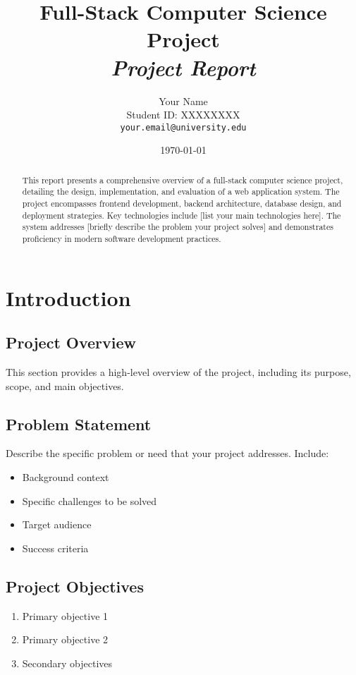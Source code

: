 \documentclass[12pt,a4paper]{article}
\title{
    \LARGE \textbf{Full-Stack Computer Science Project} \\
    \Large \textit{Project Report}
}
\author{
    Your Name \\
    Student ID: XXXXXXXX \\
    \texttt{your.email@university.edu}
}
\date{\today}
\begin{document}
\maketitle
\thispagestyle{empty}

\newpage

\begin{abstract}
This report presents a comprehensive overview of a full-stack computer science project, detailing the design, implementation, and evaluation of a web application system. The project encompasses frontend development, backend architecture, database design, and deployment strategies. Key technologies include [list your main technologies here]. The system addresses [briefly describe the problem your project solves] and demonstrates proficiency in modern software development practices.
\end{abstract}

\newpage

\tableofcontents
\newpage

\listoffigures
\newpage

\listoftables
\newpage

\section{Introduction}

\subsection{Project Overview}
This section provides a high-level overview of the project, including its purpose, scope, and main objectives.

\subsection{Problem Statement}
Describe the specific problem or need that your project addresses. Include:
\begin{itemize}
    \item Background context
    \item Specific challenges to be solved
    \item Target audience
    \item Success criteria
\end{itemize}

\subsection{Project Objectives}
\begin{enumerate}
    \item Primary objective 1
    \item Primary objective 2
    \item Secondary objectives
\end{enumerate}
\end{document}
